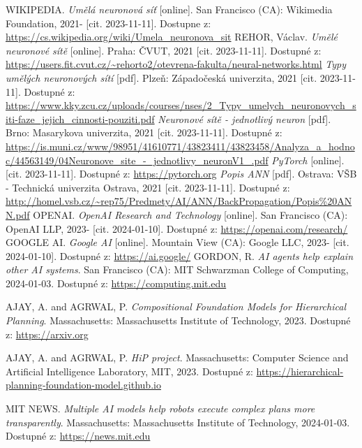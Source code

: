 \documentclass[12pt, a4paper,
twoside,        %
openright
]{report}
\begin{document}
	
	\begin{thebibliography}{99}
		 WIKIPEDIA. \textit{Umělá neuronová síť} [online]. San Francisco (CA): Wikimedia Foundation, 2021- [cit. 2023-11-11]. Dostupne z: \url{https://cs.wikipedia.org/wiki/Umela_neuronova_sit}
		 REHOR, Václav. \textit{Umělé neuronové sítě} [online]. Praha: ČVUT, 2021 [cit. 2023-11-11]. Dostupné z: \url{https://users.fit.cvut.cz/~rehorto2/otevrena-fakulta/neural-networks.html}
		 \textit{Typy umělých neuronových sítí} [pdf]. Plzeň: Západočeská univerzita, 2021 [cit. 2023-11-11]. Dostupné z: \url{https://www.kky.zcu.cz/uploads/courses/nses/2_Typy_umelych_neuronovych_siti-faze_jejich_cinnosti-pouziti.pdf}
		 \textit{Neuronové sítě - jednotlivý neuron} [pdf]. Brno: Masarykova univerzita, 2021 [cit. 2023-11-11]. Dostupné z: \url{https://is.muni.cz/www/98951/41610771/43823411/43823458/Analyza_a_hodnoc/44563149/04Neuronove_site_-_jednotlivy_neuronV1_.pdf}
		 \textit{PyTorch} [online]. [cit. 2023-11-11]. Dostupné z: \url{https://pytorch.org}
		 \textit{Popis ANN} [pdf]. Ostrava: VŠB - Technická univerzita Ostrava, 2021 [cit. 2023-11-11]. Dostupné z: \url{http://homel.vsb.cz/~rep75/Predmety/AI/ANN/BackPropagation/Popis%20ANN.pdf}
		 OPENAI. \textit{OpenAI Research and Technology} [online]. San Francisco (CA): OpenAI LLP, 2023- [cit. 2024-01-10]. Dostupné z: \url{https://openai.com/research/}
		 GOOGLE AI. \textit{Google AI} [online]. Mountain View (CA): Google LLC, 2023- [cit. 2024-01-10]. Dostupné z: \url{https://ai.google/}
		GORDON, R. \textit{AI agents help explain other AI systems}. San Francisco (CA): MIT Schwarzman College of Computing, 2024-01-03. Dostupné z: \url{https://computing.mit.edu}
		
		AJAY, A. and AGRWAL, P. \textit{Compositional Foundation Models for Hierarchical Planning}. Massachusetts: Massachusetts Institute of Technology, 2023. Dostupné z: \url{https://arxiv.org}
		
		AJAY, A. and AGRWAL, P. \textit{HiP project}. Massachusetts: Computer Science and Artificial Intelligence Laboratory, MIT, 2023. Dostupné z: \url{https://hierarchical-planning-foundation-model.github.io}
		
		MIT NEWS. \textit{Multiple AI models help robots execute complex plans more transparently}. Massachusetts: Massachusetts Institute of Technology, 2024-01-03. Dostupné z: \url{https://news.mit.edu}
		
	\end{thebibliography}
	
\end{document}
